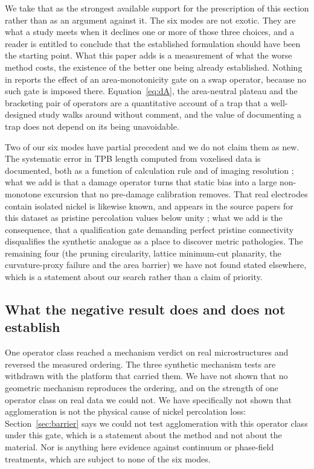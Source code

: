 \documentclass[5p,times,twocolumn]{elsarticle}
\begin{document}
We take that as the strongest available support for the prescription of this
section rather than as an argument against it. The six modes are not exotic.
They are what a study meets when it declines one or more of those three
choices, and a reader is entitled to conclude that the established formulation
should have been the starting point. What this paper adds is a measurement of what the worse method costs, the
existence of the better one being already established.
Nothing in \cite{zhou2023} reports the effect of an area-monotonicity gate on
a swap operator, because no such gate is imposed there.
Equation~\eqref{eq:dA}, the area-neutral plateau and the bracketing pair of
operators are a quantitative account of a trap that a well-designed study
walks around without comment, and the value of documenting a trap does not
depend on its being unavoidable.

Two of our six modes have partial precedent and we do not claim them as new.
The systematic error in TPB length computed from voxelised data is documented,
both as a function of calculation rule \cite{jorgensen2014} and of imaging
resolution \cite{shimura2016}; what we add is that a damage operator turns
that static bias into a large non-monotone excursion that no pre-damage
calibration removes. That real electrodes contain isolated nickel is likewise
known, and appears in the source papers for this dataset as pristine
percolation values below unity \cite{pecho2015transport}; what we add is the
consequence, that a qualification gate demanding perfect pristine connectivity
disqualifies the synthetic analogue as a place to discover metric pathologies.
The remaining four (the pruning circularity, lattice minimum-cut planarity,
the curvature-proxy failure and the area barrier) we have not found stated
elsewhere, which is a statement about our search rather than a claim of
priority.

\subsection{What the negative result does and does not establish}
\label{sec:limits}

One operator class reached a mechanism verdict on real microstructures and
reversed the measured ordering. The three synthetic mechanism tests are
withdrawn with the platform that carried them. We have not shown that no
geometric mechanism reproduces the ordering, and on the strength of one
operator class on real data we could not. We have specifically not shown that agglomeration is not the
physical cause of nickel percolation loss: Section~\ref{sec:barrier} says we
could not test agglomeration with this operator class under this gate, which
is a statement about the method and not about the material. Nor is anything
here evidence against continuum or phase-field treatments, which are subject
to none of the six modes.
\end{document}

